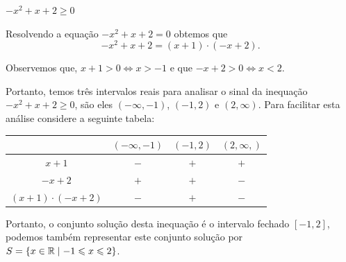  \begin{exem}
 $-x^2 + x + 2 \geqslant 0$
 
 Resolvendo a equação $-x^2 + x + 2= 0$ obtemos que
\begin{equation}
-x^2 + x + 2 = (x+1) \cdot (-x+2) . 
\end{equation}
 
 Observemos que, $x+1> 0 \Leftrightarrow x> -1$ e que $-x+2> 0 \Leftrightarrow x<2$. 
 
 Portanto, temos três intervalos reais para analisar o sinal da inequação $-x^2 + x + 2 \geqslant 0$, são eles $(-\infty, -1)$, $(-1, 2)$ e $(2, \infty)$. Para facilitar esta análise considere a seguinte tabela:
 
 \begin{table}[H]
 \centering
 \begin{tabular}{|c|c|c|c|} \hline
 \rowcolor{cinza}
                      & $(-\infty, -1)$ & $(-1, 2)$ & $(2, \infty,)$ \\ \hline
                $x+1$ & $-$             & $+$       & $+$ \\ \hline
               $-x+2$ & $+$             & $+$       & $-$ \\ \hline
 $(x+1) \cdot (-x+2)$ & $-$             & $+$       & $-$ \\ \hline
 \end{tabular}
 \end{table} 
 
 Portanto, o conjunto solução desta inequação é o intervalo fechado $[-1, 2]$, podemos também representar este conjunto solução por $S= \left\{ x \in \mathbb{R} \mid -1 \leqslant x \leqslant 2 \right\}$.
 
 \end{exem}
 
